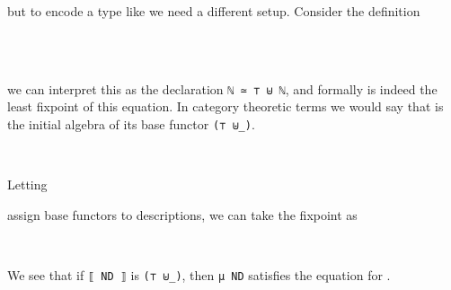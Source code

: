 but to encode a type like \bN{} we need a different setup. Consider the definition
\begin{code}%
\>[0]\AgdaSpace{}%
\AgdaSpace{}%
\AgdaSymbol{:}\AgdaSpace{}%
\AgdaSpace{}%
\<%
\\
\>[0][@{}l@{\AgdaIndent{0}}]%
\>[2]%
\>[8]\AgdaSymbol{:}\AgdaSpace{}%
\<%
\\
%
\>[2]%
\>[8]\AgdaSymbol{:}\AgdaSpace{}%
\AgdaSpace{}%
\AgdaSpace{}%
\<%
\end{code}
we can interpret this as the declaration \texttt{ℕ ≃ ⊤ ⊎ ℕ}, and formally  is indeed the least fixpoint of this equation. In category theoretic terms we would say that  is the initial algebra of its base functor \texttt{(⊤ ⊎\_)}.
\begin{code}[hide]%
\>[0]\AgdaSpace{}%
\AgdaSpace{}%
\<%
\\
\>[0][@{}l@{\AgdaIndent{0}}]%
\>[2]\AgdaSpace{}%
\AgdaSpace{}%
\AgdaSymbol{:}\AgdaSpace{}%
\<%
\end{code} 
Letting
\begin{code}%
%
\>[2]\AgdaSpace{}%
\AgdaSymbol{:}\AgdaSpace{}%
\AgdaSpace{}%
\AgdaSpace{}%
\AgdaSpace{}%
\AgdaSpace{}%
\<%
\end{code}
assign base functors to descriptions, we can take the fixpoint as
\begin{code}%
%
\>[2]\AgdaSpace{}%
\AgdaSpace{}%
\AgdaSymbol{(}\AgdaSpace{}%
\AgdaSymbol{:}\AgdaSpace{}%
\AgdaSymbol{)}\AgdaSpace{}%
\AgdaSymbol{:}\AgdaSpace{}%
\AgdaSpace{}%
\<%
\\
\>[2][@{}l@{\AgdaIndent{0}}]%
\>[4]\AgdaSpace{}%
\AgdaSymbol{:}\AgdaSpace{}%
\AgdaSpace{}%
\AgdaSpace{}%
\AgdaSpace{}%
\AgdaSymbol{(}\AgdaSpace{}%
\AgdaSymbol{)}\AgdaSpace{}%
\AgdaSpace{}%
\AgdaSpace{}%
\<%
\end{code}
We see that if \texttt{⟦ ND ⟧} is \texttt{(⊤ ⊎\_)}, then \texttt{μ ND} satisfies the equation for .


